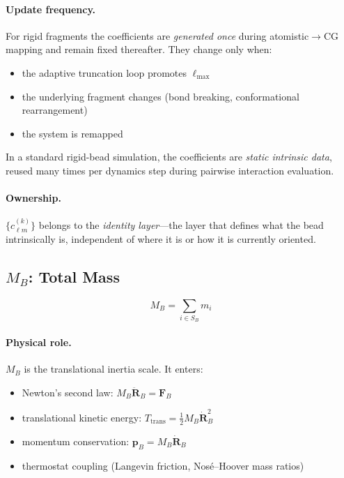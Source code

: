 \documentclass[11pt]{article}
\begin{document}
\paragraph{Update frequency.}
For rigid fragments the coefficients are \emph{generated once} during
atomistic$\to$CG mapping and remain fixed thereafter.  They change only when:
\begin{itemize}
    \item the adaptive truncation loop promotes $\ell_{\max}$
    \item the underlying fragment changes (bond breaking, conformational rearrangement)
    \item the system is remapped
\end{itemize}
In a standard rigid-bead simulation, the coefficients are \emph{static
intrinsic data}, reused many times per dynamics step during pairwise
interaction evaluation.

\paragraph{Ownership.}
$\{c_{\ell m}^{(k)}\}$ belongs to the \emph{identity layer}---the layer
that defines what the bead intrinsically is, independent of where it is or
how it is currently oriented.

\subsection{$M_B$: Total Mass}

\begin{equation}
    M_B = \sum_{i \in S_B} m_i
\end{equation}

\paragraph{Physical role.}
$M_B$ is the translational inertia scale.  It enters:
\begin{itemize}
    \item Newton's second law: $M_B \ddot{\mathbf{R}}_B = \mathbf{F}_B$
    \item translational kinetic energy:
          $T_{\mathrm{trans}} = \tfrac{1}{2} M_B \dot{\mathbf{R}}_B^2$
    \item momentum conservation: $\mathbf{p}_B = M_B \dot{\mathbf{R}}_B$
    \item thermostat coupling (Langevin friction, Nos\'e--Hoover mass ratios)
\end{itemize}
\end{document}
